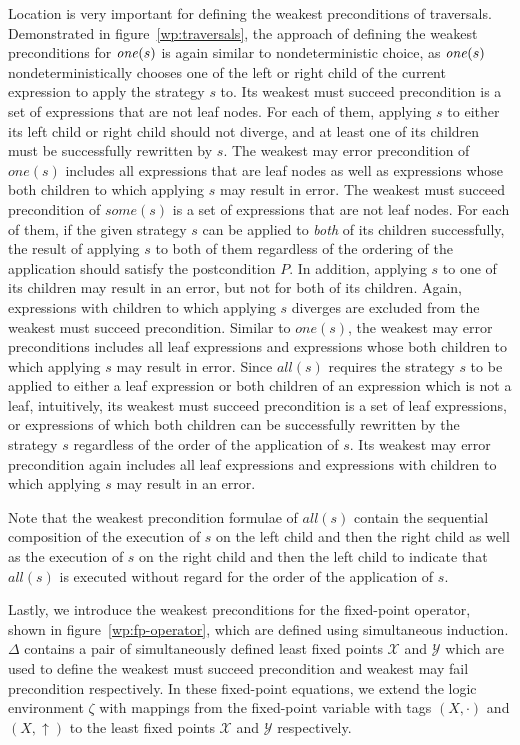 Location is very important for defining the weakest preconditions of traversals. Demonstrated in figure~\ref{wp:traversals}, the approach of defining the weakest preconditions for $\text{\textit{one}\/}(s)$ is again similar to nondeterministic choice, as $\text{\textit{one}\/}(s)$ nondeterministically chooses one of the left or right child of the current expression to apply the strategy $s$ to. Its weakest must succeed precondition is a set of expressions that are not leaf nodes. For each of them, applying $s$ to either its left child or right child should not diverge, and at least one of its children must be successfully rewritten by $s$. The weakest may error precondition of $\mathit{one}(s)$ includes all expressions that are leaf nodes as well as expressions whose both children to which applying $s$ may result in error.
The weakest must succeed precondition of $\mathit{some}(s)$ is a set of expressions that are not leaf nodes. For each of them, if the given strategy $s$ can be applied to \emph{both} of its children successfully, the result of applying $s$ to both of them regardless of the ordering of the application should satisfy the postcondition $P$. In addition, applying $s$ to one of its children may result in an error, but not for both of its children. Again, expressions with children to which applying $s$ diverges are excluded from the weakest must succeed precondition. Similar to $\mathit{one}(s)$, the weakest may error preconditions includes all leaf expressions and expressions whose both children to which applying $s$ may result in error. Since $\mathit{all}(s)$ requires the strategy $s$ to be applied to either a leaf expression or both children of an expression which is not a leaf, intuitively, its weakest must succeed precondition is a set of leaf expressions, or expressions of which both children can be successfully rewritten by the strategy $s$ regardless of the order of the application of $s$. Its weakest may error precondition again includes all leaf expressions and expressions with children to which applying $s$ may result in an error. \begin{highlightnew}Note that the weakest precondition formulae of $\mathit{all}(s)$ contain the sequential composition of the execution of $s$ on the left child and then the right child as well as the execution of $s$ on the right child and then the left child to indicate that $\mathit{all}(s)$ is executed without regard for the order of the application of $s$.\end{highlightnew}

Lastly, we introduce the weakest preconditions for the fixed-point operator, shown in figure~\ref{wp:fp-operator}, which are defined using simultaneous induction. $\Delta$ contains a pair of simultaneously defined least fixed points $\mathscr{X}$ and $\mathscr{Y}$ which are used to define the weakest must succeed precondition and weakest may fail precondition respectively. In these fixed-point equations, we extend the logic environment $\zeta$ with mappings from the fixed-point variable with tags $(X, \cdot)$ and $(X, \uparrow)$ to the least fixed points $\mathscr{X}$ and $\mathscr{Y}$ respectively.


